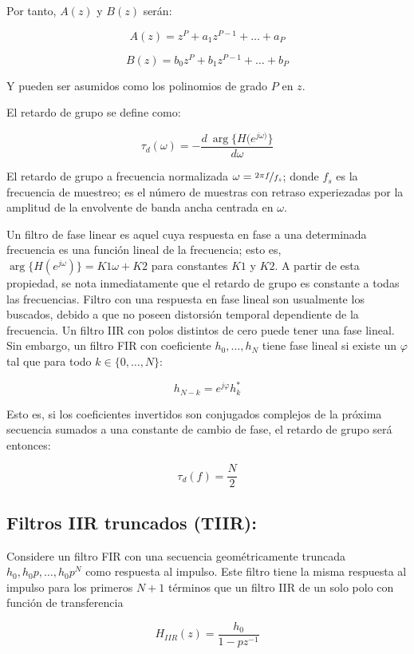 \documentclass[conference]{IEEEtran}
\begin{document}
Por tanto, \(A(z)\) y \(B(z)\) serán:

\begin{equation}
    A(z) = z^{P} + a_1 z^{P-1} + \ldots + a_P
\end{equation}

\begin{equation}
    B(z) = b_0 z^P + b_1 z^{P-1} + \ldots + b_P
\end{equation}

Y pueden ser asumidos como los polinomios de grado \(P\) en \(z\).

El retardo de grupo se define como:

\begin{equation}
    \tau_d(\omega) = - \frac{d \: \arg\{H(e^{j\omega)}\}}{d\omega}
\end{equation}

El retardo de grupo a frecuencia normalizada \(\omega=\nicefrac{2 \pi f}{f_s}\); donde \(f_s\) es la frecuencia de muestreo; es el número de muestras con retraso experiezadas por la amplitud de la envolvente de banda ancha centrada en \(\omega\).

Un filtro de fase linear es aquel cuya respuesta en fase a una determinada frecuencia es una función lineal de la frecuencia; esto es, \(\arg \{H(e^{j\omega})\}=K1\omega + K2\) para constantes \(K1\) y \(K2\). A partir de esta propiedad, se nota inmediatamente que el retardo de grupo es constante a todas las frecuencias. Filtro con una respuesta en fase lineal son usualmente los buscados, debido a que no poseen distorsión temporal dependiente de la frecuencia. Un filtro IIR con polos distintos de cero puede tener una fase lineal. Sin embargo, un filtro FIR con coeficiente \(h_0,\ldots , h_N\) tiene fase lineal si existe un \(\varphi\) tal que para todo \(k \in \{0,\ldots , N\}\):

\begin{equation}
    h_{N-k} = e^{j\varphi} h^{*}_k
\end{equation}

Esto es, si los coeficientes invertidos son conjugados complejos de la próxima secuencia sumados a una constante de cambio de fase, el retardo de grupo será entonces:

\begin{equation}
    \tau_d (f) = \frac{N}{2}
\end{equation}
\subsection{Filtros IIR truncados (TIIR):}
\label{sec:orgf5731f6}

Considere un filtro FIR con una secuencia geométricamente truncada \(h_0,h_0p,\ldots , h_0 p^N\) como respuesta al impulso. Este filtro tiene la misma respuesta al impulso para los primeros \(N+1\) términos que un filtro IIR de un solo polo con función de transferencia

\begin{equation}
    H_{IIR}(z) = \frac{h_0}{1- p z^{-1}}
\end{equation}
\end{document}
